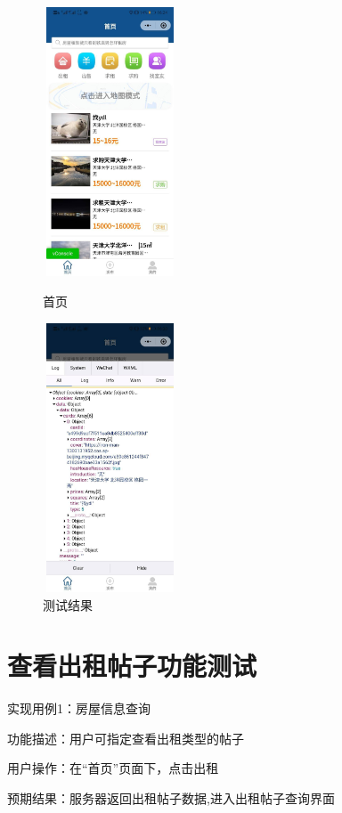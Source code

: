 \begin{figure}[htbp]
    \centering
    \begin{minipage}[t]{0.48\textwidth}
    \centering
    \includegraphics[width=4cm,height=8cm]{test/image/test6.png} 
    \caption{首页}
    \end{minipage}
    \begin{minipage}[t]{0.48\textwidth}
    \centering
    \includegraphics[width=4cm,height=8cm]{test/image/test7.png}
    \caption{测试结果}
    \end{minipage}
    \end{figure}
\section{查看出租帖子功能测试}
实现用例1：房屋信息查询

功能描述：用户可指定查看出租类型的帖子

用户操作：在“首页”页面下，点击出租 

预期结果：服务器返回出租帖子数据,进入出租帖子查询界面

